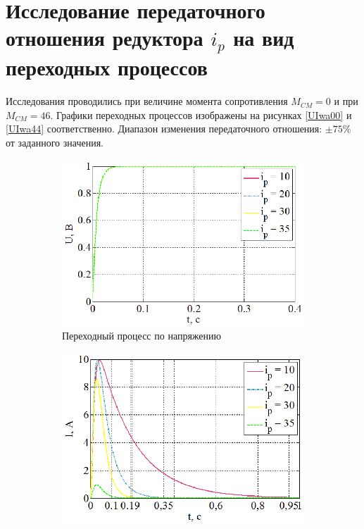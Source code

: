 \documentclass[a4paper,12pt]{article} %
\begin{document}
\section{Исследование передаточного отношения редуктора $i_p$ на вид переходных процессов}
Исследования проводились при величине момента сопротивления $M_{CM}=0$ и при $M_{CM}=46$. Графики переходных процессов изображены на рисунках \ref{UIwa00} и \ref{UIwa44} соответственно. Диапазон изменения передаточного отношения: $\pm 75\%$  от заданного значения. 
\begin{figure}[H]
	\centering
	\begin{subfigure}[b]{0.48\textwidth}
	    \includegraphics[width = \textwidth]{scheme/U3}
		\caption{Переходный процесс по напряжению}
	\end{subfigure}
	\hfill
	\begin{subfigure}[b]{0.48\textwidth}
		\includegraphics[width = \textwidth]{scheme/I3}

\end{subfigure}
\end{figure}
\end{document}
